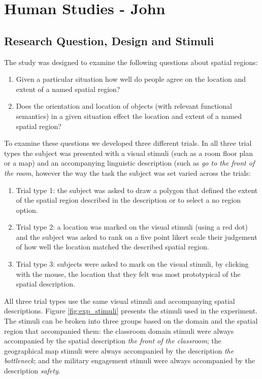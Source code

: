 \documentclass[11pt,letterpaper]{article}
\begin{document}
\section{Human Studies - John}

\subsection{Research Question, Design and Stimuli}

The study was designed to examine the following questions about spatial regions:
\begin{enumerate}
	\item Given a particular situation how well do people agree on the location and extent of a named spatial region?
	\item Does the orientation and location of objects (with relevant functional semantics) in a given situation effect the location and extent of a named spatial region?
\end{enumerate}

To examine these questions we developed three different trials. In all three trial types the subject was presented with a visual stimuli (such as a room floor plan or a map) and an accompanying linguistic description (such as \emph{go to the front of the room}, however the way the task the subject was set varied across the trials:
\begin{enumerate}
	\item Trial type 1: the subject was asked to draw a polygon that defined the extent of the spatial region described in the description or to select a no region option.
	\item Trial type 2: a location was marked on the visual stimuli (using a red dot) and the subject was asked to rank on a five point likert scale their judgement of how well the location matched the described spatial region.  
	\item Trial type 3: subjects were asked to mark on the visual stimuli, by clicking with the mouse, the location that they felt was most prototypical of the spatial description. 
\end{enumerate}

All three trial types use the same visual stimuli and accompanying spatial descriptions. Figure \ref{fig:exp_stimuli} presents the stimuli used in the experiment. The stimuli can be broken into three groups based on the domain and the spatial region that accompanied them: the classroom domain stimuli were always accompanied by the spatial description \emph{the front of the classroom}; the geographical map stimuli were always accompanied by the description \emph{the bottleneck}; and the military engagement stimuli were always accompanied by the description \emph{safety}. 
\end{document}

